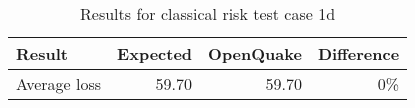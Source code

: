 \begin{table}[htbp]

\centering
\begin{tabular}{ l r r r }

\hline
\rowcolor{anti-flashwhite}
\bf{Result} & \bf{Expected} & \bf{OpenQuake} & \bf{Difference}\\
\hline
Average loss & 59.70 & 59.70 & 0\% \\
\hline
\end{tabular}

\caption{Results for classical risk test case 1d}
\label{tab:result-classical-risk-1d}
\end{table}
